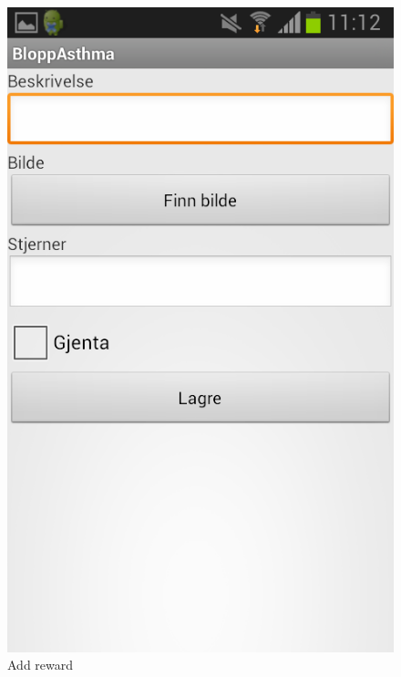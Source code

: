 \begin{figure}
\begin{minipage}[b]{0.3\linewidth}
		\includegraphics[width=0.20\paperwidth]{Pictures/app-screenshots/add-reward.png}
		\caption{Add reward}
		\label{fig:add-reward}
	\end{minipage}
\end{figure}
% 